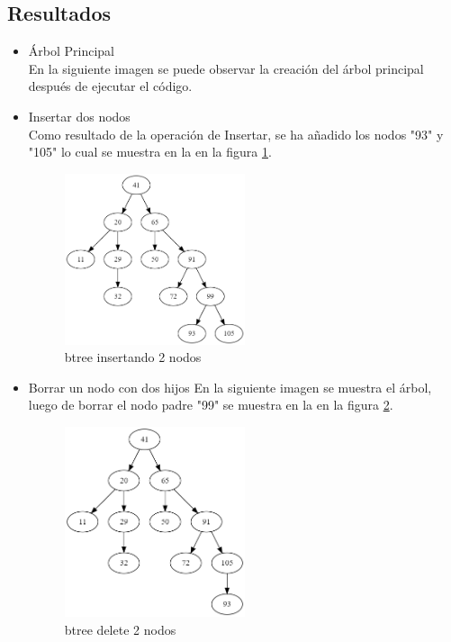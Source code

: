 \documentclass{article}
\begin{document}
        \subsection{Resultados}
        \begin{itemize}
          \item Árbol Principal \\
         En la siguiente imagen se puede observar la creación del árbol principal después de ejecutar el código.
                  
          \item Insertar dos nodos \\
            Como resultado de la operación de Insertar, se ha añadido los nodos "93" y "105" lo cual se muestra en la en la figura \ref{fig:btree_insertando_2_nodos}.
            \begin{figure}[htbp]
              \centering
              \includegraphics[width=0.5\textwidth]{img/btree_insertando_2_nodos.png}
              \caption{btree insertando 2 nodos}
              \label{fig:btree_insertando_2_nodos}
            \end{figure}  
          \item  Borrar un nodo con dos hijos
            En la siguiente imagen se muestra el árbol, luego de borrar el nodo padre "99" se muestra en la en la figura \ref{fig:btree_delete_nodo_padre_2_hijos}.
            \begin{figure}[htbp]
              \centering
              \includegraphics[width=0.5\textwidth]{img/btree_delete_nodo_padre_2_hijos.png}
              \caption{btree delete 2 nodos}
              \label{fig:btree_delete_nodo_padre_2_hijos}
            \end{figure} 
            

\end{itemize}
\end{document}
